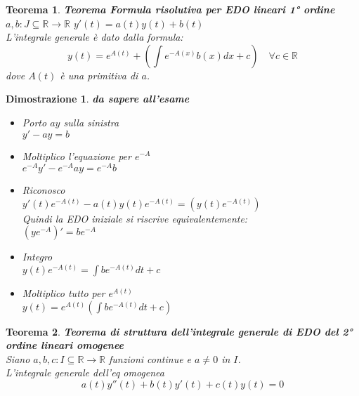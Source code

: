 \documentclass[10pt,landscape, a4paper]{article}
\makeatletter
\newtheorem{teorema}{Teorema}
\newenvironment{thm}{\begin{mdframed}[backgroundcolor=white]\begin{teorema}}{\end{teorema}\end{mdframed}}
\newtheorem{demnstrn}{Dimostrazione}
\newenvironment{dimostrazione}{\begin{mdframed}[backgroundcolor=white]\begin{demnstrn}}{\end{demnstrn}\end{mdframed}}
\renewcommand{\section}{\@startsection{section}{1}{0mm}%
                                {-1ex plus -.5ex minus -.2ex}%
                                {0.5ex plus .2ex}%
                                {\normalfont\large\bfseries}}
\makeatother
\begin{document}
\begin{multicols}{3}


\begin{thm}
	\textbf{Teorema Formula risolutiva per EDO lineari 1° ordine}\\
$a,b: J\subseteq\mathbb{R}\to\mathbb{R}$ \quad $y'(t) = a(t)y(t)+b(t)$\\
L'integrale generale è dato dalla formula:
\begin{equation}
	y(t)=e^{A(t)}+\left( \int e^{-A(x)}b(x)dx + c \right) \quad \forall c\in \mathbb{R}
\end{equation}
dove $A(t)$ è una primitiva di $a$.
\end{thm}

\begin{dimostrazione}
\emph{\textbf{da sapere all'esame}}
\begin{itemize}
	\item Porto $ay$ sulla sinistra\\
			$y'-ay=b$
	\item Moltiplico l'equazione per $e^{-A}$\\
			$e^{-A}y'-e^{-A}ay=e^{-A}b$
	\item Riconosco\\
			$y'(t)e^{-A(t)}-a(t)y(t)e^{-A(t)}=\left(y(t)e^{-A(t)}\right)$\\
			Quindi la EDO iniziale si riscrive equivalentemente:\\
			$(ye^{-A})'=be^{-A}$
	\item Integro\\
			$y(t)e^{-A(t)}=\int be^{-A(t)}dt+c$
	\item Moltiplico tutto per $e^{A(t)}$\\
			$y(t)=e^{A(t)}\left(\int be^{-A(t)}dt+c\right)$
\end{itemize}
\end{dimostrazione}
\newpage



\begin{thm}
\textbf{Teorema di struttura dell'integrale generale di EDO del 2° ordine lineari omogenee}\\
Siano $a,b,c : I \subseteq \mathbb{R} \to \mathbb{R}$ funzioni continue e $a \neq 0$ in $I$.\\
L'integrale generale dell'eq omogenea
\begin{equation}
a(t)y''(t) + b(t)y'(t) + c(t)y(t) = 0
\end{equation}


\end{thm}
\end{multicols}
\end{document}
